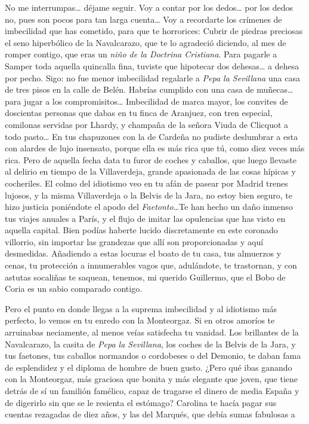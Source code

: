 \documentclass[oneside,14pt,spanish,]{extbook} %
\begin{document}
No me interrumpas\ldots{} déjame seguir. Voy a contar por los
dedos\ldots{} por los dedos no, pues son pocos para tan larga
cuenta\ldots{} Voy a recordarte los crímenes de imbecilidad que has
cometido, para que te horrorices: Cubrir de piedras preciosas el seno
hiperbólico de la Navalcarazo, que te lo agradeció diciendo, al mes de
romper contigo, que eras un \emph{niño de la Doctrina Cristiana}. Para
pagarle a Samper toda aquella quincalla fina, tuviste que hipotecar dos
dehesas\ldots{} a dehesa por pecho. Sigo: no fue menor imbecilidad
regalarle a \emph{Pepa la Sevillana} una casa de tres pisos en la calle
de Belén. Habrías cumplido con una casa de muñecas\ldots{} para jugar a
los compromisitos\ldots{} Imbecilidad de marca mayor, los convites de
doscientas personas que dabas en tu finca de Aranjuez, con tren
especial, comilonas servidas por Lhardy, y champaña de la señora Viuda
de Clicquot a todo pasto\ldots{} En tus chapuzones con la de Cardeña no
pudiste deslumbrar a esta con alardes de lujo insensato, porque ella es
más rica que tú, como diez veces más rica. Pero de aquella fecha data tu
furor de coches y caballos, que luego llevaste al delirio en tiempo de
la Villaverdeja, grande apasionada de las cosas hípicas y cocheriles. El
colmo del idiotismo veo en tu afán de pasear por Madrid trenes lujosos,
y la misma Villaverdeja o la Belvis de la Jara, no estoy bien seguro, te
hizo justicia poniéndote el apodo del \emph{Faetonto}\ldots Te han hecho
un daño inmenso tus viajes anuales a París, y el flujo de imitar las
opulencias que has visto en aquella capital. Bien podías haberte lucido
discretamente en este coronado villorrio, sin importar las grandezas que
allí son proporcionadas y aquí desmedidas. Añadiendo a estas locuras el
boato de tu casa, tus almuerzos y cenas, tu protección a innumerables
vagos que, adulándote, te trastornan, y con astutas socaliñas te
saquean, tenemos, mi querido Guillermo, que el Bobo de Coria es un sabio
comparado contigo.

Pero el punto en donde llegas a la suprema imbecilidad y al idiotismo
más perfecto, lo vemos en tu enredo con la Monteorgaz. Si en otros
amoríos te arruinabas neciamente, al menos veías satisfecha tu vanidad.
Los brillantes de la Navalcarazo, la casita de \emph{Pepa la Sevillana},
los coches de la Belvis de la Jara, y tus faetones, tus caballos
normandos o cordobeses o del Demonio, te daban fama de esplendidez y el
diploma de hombre de buen gusto. ¿Pero qué ibas ganando con la
Monteorgaz, más graciosa que bonita y más elegante que joven, que tiene
detrás de sí un familión famélico, capaz de tragarse el dinero de media
España y de digerirlo sin que se le resienta el estómago? Carolina te
hacía pagar sus cuentas rezagadas de diez años, y las del Marqués, que
debía sumas fabulosas a Utrilla y a los dependientes del Casino. Seguían
los hermanos de ella, los hermanos de él, todos unos perdidos, con
hambre atrasada de dinero y de protección\ldots{} Caían sobre ti como
nube de langosta, y tú, que no sabes negar nada y eres un fenómeno
morboso de generosidad; tú, Guillermo, que si hubieras sido mujer,
habrías entregado tu honor al primer pedigüeño que se te pusiera
delante; tú, Guillermo, a todos consolabas, creyendo rodearte de
agradecidos, y lo que hacías era enseñar la ingratitud a los
viciosos\ldots{}
\end{document}
